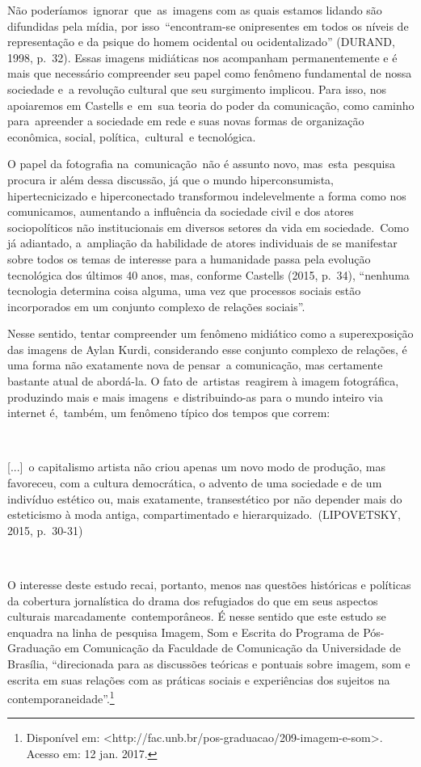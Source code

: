 \documentclass[
  letterpaper,
  a4paper,
  12pt]{scrbook}
\renewenvironment{quote}
  {\par\singlespacing\small\list{}{\rightmargin=0cm \leftmargin=4cm}%
   \item\relax}
  {\endlist}
\begin{document}
Não poderíamos~ignorar~que~as~imagens com as quais estamos lidando são
difundidas pela mídia, por isso~``encontram-se onipresentes em todos os
níveis de representação e da psique do homem ocidental ou
ocidentalizado'' (DURAND, 1998, p.~32). Essas imagens midiáticas nos
acompanham permanentemente e é mais que necessário compreender seu papel
como fenômeno fundamental de nossa sociedade e~a revolução cultural que
seu surgimento implicou. Para isso, nos apoiaremos em Castells e~em~sua
teoria do poder da comunicação, como caminho para~apreender a sociedade
em rede e suas novas formas de organização econômica, social,
política,~cultural~e tecnológica.~

O papel da fotografia na~comunicação~não é assunto novo,
mas~esta~pesquisa procura ir além dessa discussão, já que o mundo
hiperconsumista, hipertecnicizado e hiperconectado transformou
indelevelmente a forma como nos comunicamos, aumentando a influência da
sociedade civil e dos atores sociopolíticos não institucionais em
diversos setores da vida em sociedade.~Como já adiantado, a~ampliação da
habilidade de atores individuais de se manifestar sobre todos os temas
de interesse para a humanidade passa pela evolução tecnológica dos
últimos 40 anos, mas, conforme Castells (2015, p.~34), ``nenhuma
tecnologia determina coisa alguma, uma vez que processos sociais estão
incorporados em um conjunto complexo de relações sociais''.

Nesse sentido, tentar compreender um fenômeno midiático como a
superexposição das imagens de Aylan Kurdi, considerando esse conjunto
complexo de relações, é uma forma não exatamente nova de pensar~a
comunicação, mas certamente bastante atual de abordá-la. O fato
de~artistas~reagirem à imagem fotográfica, produzindo mais e mais
imagens~e distribuindo-as para o mundo inteiro via internet é,~também,
um fenômeno típico dos tempos que correm:~

~

\begin{quote}
{[}...{]}~o capitalismo artista não criou apenas um novo modo de
produção, mas favoreceu, com a cultura democrática, o advento de uma
sociedade e de um indivíduo estético ou, mais exatamente, transestético
por não depender mais do esteticismo à moda antiga, compartimentado e
hierarquizado.~(LIPOVETSKY, 2015, p.~30-31)~
\end{quote}

~

O interesse deste estudo recai, portanto, menos nas questões históricas
e políticas da cobertura jornalística do drama dos refugiados do que em
seus aspectos culturais marcadamente~contemporâneos. É nesse sentido que
este estudo se enquadra na linha de pesquisa Imagem, Som e Escrita do
Programa de Pós-Graduação em Comunicação da Faculdade de Comunicação da
Universidade de Brasília, ``direcionada para as discussões teóricas e
pontuais sobre imagem, som e escrita em suas relações com as práticas
sociais e experiências dos sujeitos na contemporaneidade''.\footnote{Disponível
  em:
  \textless http://fac.unb.br/pos-graduacao/209-imagem-e-som\textgreater.
  Acesso em: 12 jan. 2017.}
\end{document}
